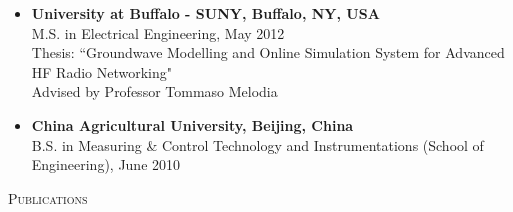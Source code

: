 \documentclass[letter]{article}
\newcommand{\heading}[1]{\item \large \textsc{#1} \normalsize}
\newcommand{\publication}[4]{\item #1. #2. \emph{#3.} #4}
\begin{document}
\begin{description}
\begin{itemize}
\item \textbf{University at Buffalo - SUNY, Buffalo, NY, USA} \\
M.S. in Electrical Engineering, May 2012\\
Thesis: ``Groundwave Modelling and Online Simulation System for Advanced HF Radio Networking" \\
Advised by Professor Tommaso Melodia

\item \textbf{China Agricultural University, Beijing, China} \\
B.S. in Measuring \& Control Technology and Instrumentations (School of Engineering), June 2010\\
\end{itemize}

%




\heading{Publications}














\end{description}
\end{document}
